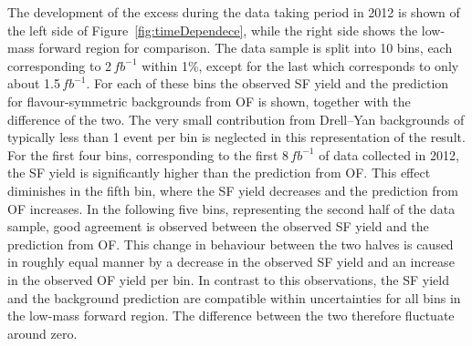 The development of the excess during the data taking period in 2012 is shown of the left side of Figure~\ref{fig:timeDependece}, while the right side shows the low-mass forward region for comparison. The data sample is split into 10 bins, each corresponding to 2\,$fb^{-1}$ within 1\%, except for the last which corresponds to only  about 1.5\,$fb^{-1}$. For each of these bins the observed SF yield and the prediction for flavour-symmetric backgrounds from OF is shown, together with the difference of the two. The very small contribution from Drell--Yan backgrounds of typically less than 1 event per bin is neglected in this representation of the result. For the first four bins, corresponding to the first 8\,$fb^{-1}$ of data collected in 2012, the SF yield is significantly higher than the prediction from OF. This effect diminishes in the fifth bin, where the SF yield decreases and the prediction from OF increases. In the following five bins, representing the second half of the data sample, good agreement is observed between the observed SF yield and the prediction from OF. This change in behaviour between the two halves is caused in roughly equal manner by a decrease in the observed SF yield and an increase in the observed OF yield per bin. In contrast to this observations, the SF yield and the background prediction are compatible within uncertainties for all bins in the low-mass forward region. The difference between the two therefore fluctuate around zero.


